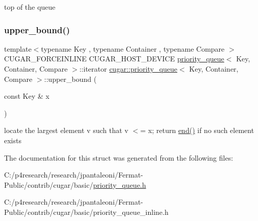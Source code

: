 top of the queue \mbox{\label{structcugar_1_1priority__queue_a31cc4b1e4f45712ec454ef62052db97a}} 
\subsubsection{\texorpdfstring{upper\+\_\+bound()}{upper\_bound()}}
{\footnotesize\ttfamily template$<$typename Key , typename Container , typename Compare $>$ \\
C\+U\+G\+A\+R\+\_\+\+F\+O\+R\+C\+E\+I\+N\+L\+I\+NE C\+U\+G\+A\+R\+\_\+\+H\+O\+S\+T\+\_\+\+D\+E\+V\+I\+CE \hyperlink{structcugar_1_1priority__queue}{priority\+\_\+queue}$<$ Key, Container, Compare $>$\+::iterator \hyperlink{structcugar_1_1priority__queue}{cugar\+::priority\+\_\+queue}$<$ Key, Container, Compare $>$\+::upper\+\_\+bound (\begin{DoxyParamCaption}\item[{const Key \&}]{x }\end{DoxyParamCaption})}

locate the largest element v such that v $<$= x; return \hyperlink{structcugar_1_1priority__queue_a2e23a349f2e9092a2fe0b1593a91f03a}{end()} if no such element exists 

The documentation for this struct was generated from the following files\+:\begin{DoxyCompactItemize}
\item 
C\+:/p4research/research/jpantaleoni/\+Fermat-\/\+Public/contrib/cugar/basic/\hyperlink{priority__queue_8h}{priority\+\_\+queue.\+h}\item 
C\+:/p4research/research/jpantaleoni/\+Fermat-\/\+Public/contrib/cugar/basic/priority\+\_\+queue\+\_\+inline.\+h\end{DoxyCompactItemize}
